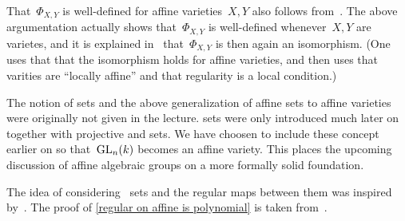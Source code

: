 \begin{remark}
  That~$\Phi_{X,Y}$ is well-defined for affine varieties~$X,Y$ also follows from~.
  The above argumentation actually shows that~$\Phi_{X,Y}$ is well-defined whenever~$X,Y$ are {\qaffine} varietes, and it is explained in~\cite{MO267198} that~$\Phi_{X,Y}$ is then again an isomorphism.
  (One uses that that the isomorphism holds for affine varieties, and then uses that {\qaffine} varities are \enquote{locally affine} and that regularity is a local condition.)
\end{remark}




\begin{fluff}
  The notion of {\qaffine} sets and the above generalization of affine sets to affine varieties were originally not given in the lecture.
  {\Qaffine} sets were only introduced much later on together with projective and {\qprojective} sets.
  We have choosen to include these concept earlier on so that~$\operatorname{GL}_n(k)$ becomes an affine variety.
  This places the upcoming discussion of affine algebraic groups on a more formally solid foundation.
  
  The idea of considering~{\qaffine} sets and the regular maps between them was inspired by~\cite[2.2]{frankeAlg1}.
  The proof of \cref{regular on affine is polynomial} is taken from~\cite[Lemma~3.10]{milneAG}.
\end{fluff}







